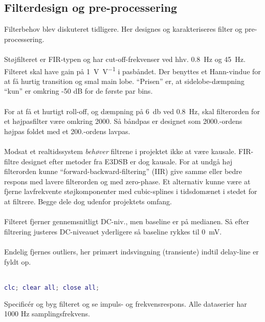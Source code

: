 \documentclass[a4paper]{report}
\begin{document}
\begin{par}

\section{Filterdesign og pre-processering}
Filterbehov blev diskuteret tidligere.
Her designes og karakteriseres filter og pre-processering.
\\ \\
Støjfilteret er FIR-typen og har cut-off-frekvenser ved hhv. \SI{0.8}{Hz} og \SI{45}{Hz}.
Filteret skal have gain på \SI[per-mode=symbol]{1}{\volt\per\volt} i pasbåndet.
Der benyttes et Hann-vindue for at få hurtig transition og smal main lobe.
``Prisen'' er, at sidelobe-dæmpning ``kun'' er omkring -50 dB for de første par bins.
\\ \\
For at få et hurtigt roll-off, og dæmpning på \SI{6}{\decibel} ved \SI{0.8}{Hz}, skal filterorden for et højpasfilter være omkring 2000.
Så båndpas er designet som 2000.-ordens højpas foldet med et 200.-ordens lavpas.
\\ \\
Modsat et realtidssystem \textit{behøver} filtrene i projektet ikke at være kausale.
FIR-filtre designet efter metoder fra E3DSB er dog kausale.
For at undgå høj filterorden kunne ``forward-backward-filtering'' (IIR) give samme eller bedre respons med lavere filterorden og med zero-phase.
Et alternativ kunne være at fjerne lavfrekvente støjkomponenter med cubic-splines i tidsdomænet i stedet for at filtrere.
Begge dele dog udenfor projektets omfang.
\\ \\
Filteret fjerner gennemsnitligt DC-niv., men baseline er på medianen.
Så efter filtrering justeres DC-niveauet yderligere så baseline rykkes til \SI{0}{\milli\volt}.
\\ \\
Endelig fjernes outliers, her primært indsvingning (transiente) indtil delay-line er fyldt op.
\\ \\

\end{par} 

\begin{lstlisting}[language=Matlab, style=Matlab-editor]
clc; clear all; close all;
\end{lstlisting}
\begin{par}
Specificér og byg filteret og se impuls- og frekvensrespons. Alle dataserier har 1000 Hz samplingsfrekvens.
\end{par} 
\end{document}
